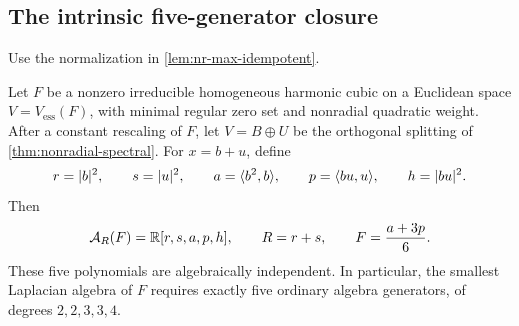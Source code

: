 \subsection{The intrinsic five-generator closure}
\label{subsec:nr-five-generators}

Use the normalization in \cref{lem:nr-max-idempotent}.

\begin{theorem}
\label{thm:nonradial-five-generators}
Let $F$ be a nonzero irreducible homogeneous harmonic cubic on a
Euclidean space $V=V_{\mathrm{ess}}(F)$, with minimal regular zero set
and nonradial quadratic weight. After a constant rescaling of $F$, let
$V=B\oplus U$ be the orthogonal splitting of
\cref{thm:nonradial-spectral}. For $x=b+u$, define
\begin{equation}\label{eq:nr-five-invariants}
 r=|b|^2,\qquad s=|u|^2,\qquad
 a=\langle b^2,b\rangle,\qquad p=\langle bu,u\rangle,\qquad h=|bu|^2.
\end{equation}
Then
\begin{equation}\label{eq:nr-five-algebra}
 \mathcal A_R(F)=\mathbb R[r,s,a,p,h],\qquad
 R=r+s,\qquad F=\frac{a+3p}{6}.
\end{equation}
These five polynomials are algebraically independent. In particular,
the smallest Laplacian algebra of $F$ requires exactly five ordinary
algebra generators, of degrees $2,2,3,3,4$.
\end{theorem}

